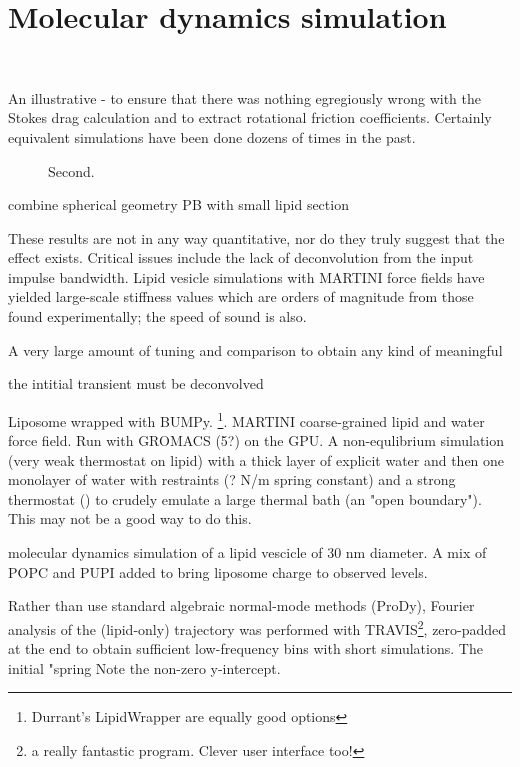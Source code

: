 \documentclass[paper.tex]{subfiles}
\begin{document}
\section{Molecular dynamics simulation}
\


An illustrative - to ensure that there was nothing egregiously wrong with the Stokes drag calculation and to extract rotational friction coefficients. Certainly equivalent simulations have been done dozens of times in the past.

\begin{figure}[H]
	\centering
	\hfill
		\caption{Second.}
		
\end{figure}

combine spherical geometry PB with small lipid section

These results are not in any way quantitative, nor do they truly suggest that the effect exists. Critical issues include the lack of deconvolution from the input impulse bandwidth. Lipid vesicle simulations with MARTINI force fields have yielded large-scale stiffness values which are orders of magnitude\cite{Determining2014} from those found experimentally; the speed of sound is also. 

A very large amount of tuning and comparison  to obtain any kind of meaningful  

the intitial transient must be deconvolved

Liposome wrapped with BUMPy\cite{BUMPy2018}. \footnote{Durrant's LipidWrapper are equally good options}. MARTINI 
coarse-grained 
lipid and water force field. Run with GROMACS (5?) on the GPU. A non-equlibrium simulation (very weak thermostat on lipid) with a thick layer of explicit water and then one monolayer of water with restraints (? N/m spring constant) and a strong thermostat () to crudely emulate a large thermal bath (an "open boundary"). This may not be a good way to do this.

molecular dynamics simulation of a lipid vescicle of 30 nm diameter. A mix of POPC and PUPI added to bring liposome charge to 
observed levels.

Rather than use standard algebraic normal-mode methods (ProDy), Fourier analysis of the (lipid-only) trajectory was performed with TRAVIS\footnote{a really fantastic program. Clever user interface too!}, zero-padded at the end to obtain sufficient low-frequency bins with short simulations. The initial "spring Note the non-zero y-intercept. 
\end{document}
